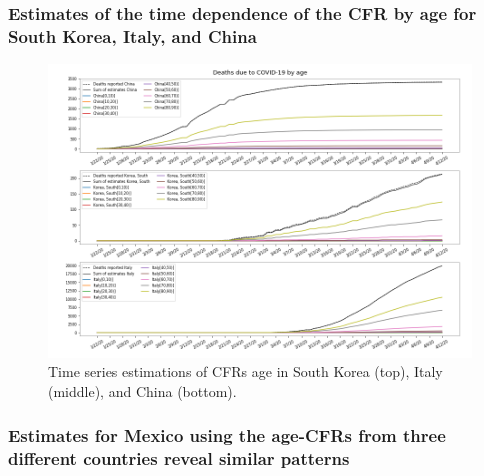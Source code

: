 \documentclass[8pt]{article}
\begin{document}
\subsubsection{Estimates of the time dependence of the CFR by age for South Korea, Italy, and China}

\begin{figure}[h]
    \centering
    \includegraphics[width=\textwidth]{figures/tsam_COVID19_JHU_cfr+propDeathCasesByAgeTS.png}
    \caption{Time series estimations of CFRs age in South Korea (top), Italy (middle), and China (bottom).}
    \label{fig:cfrsAge}
\end{figure}



\subsubsection{Estimates for Mexico using the age-CFRs from three different countries reveal similar patterns}
\end{document}
